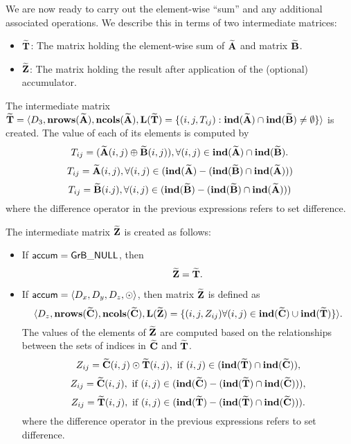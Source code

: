 We are now ready to carry out the element-wise ``sum'' and any additional 
associated operations.  We describe this in terms of two intermediate matrices:
\begin{itemize}
	\item ${\bf \widetilde{T}}$: The matrix holding the element-wise sum of
    ${\bf \widetilde{A}}$ and matrix ${\bf \widetilde{B}}$.
	\item ${\bf \widetilde{Z}}$: The matrix holding the result after 
    application of the (optional) accumulator.
\end{itemize}

The intermediate matrix ${\bf \widetilde{T}} = \langle
D_3, \bold{nrows}({\bf \widetilde{A}}), \bold{ncols}({\bf \widetilde{A}}),
\bold{L}({\bf \widetilde{T}}) =
\{(i,j,T_{ij}) : \bold{ind}({\bf \widetilde{A}}) \cap 
\bold{ind}({\bf \widetilde{B}})
 \neq \emptyset \} \rangle$
is created.  The value of each of its elements is computed by 
\[T_{ij} = ({\bf \widetilde{A}}(i,j) \oplus {\bf \widetilde{B}}(i,j)), \forall (i,j) \in \bold{ind}({\bf \widetilde{A}}) \cap \bold{ind}({\bf \widetilde{B}}).\]
\[T_{ij} = {\bf \widetilde{A}}(i,j), \forall (i,j) \in (\bold{ind}({\bf \widetilde{A}}) - (\bold{ind}({\bf \widetilde{B}}) \cap \bold{ind}({\bf \widetilde{A}})))\]
\[T_{ij} = {\bf \widetilde{B}}(i.j), \forall (i,j) \in (\bold{ind}({\bf \widetilde{B}}) - (\bold{ind}({\bf \widetilde{B}}) \cap \bold{ind}({\bf \widetilde{A}})))\]
where the difference operator in the previous expressions refers to set difference.


The intermediate matrix ${\bf \widetilde{Z}}$ is created as follows:
\begin{itemize}
    \item If ${\sf accum} = {\sf GrB\_NULL}$, then \[ {\bf \widetilde{Z}} = {\bf \widetilde{T}}.\]

    \item If ${\sf accum} = \langle D_x, D_y, D_z, \odot \rangle$, then matrix ${\bf \widetilde{Z}}$ is defined as 
        \[ \langle D_z, \bold{nrows}({\bf \widetilde{C}}), \bold{ncols}({\bf \widetilde{C}}), \bold{L}({\bf \widetilde{Z}})
		= \{(i,j,Z_{ij})  \forall (i,j) \in \bold{ind}({\bf \widetilde{C}}) \cup 
        \bold{ind}({\bf \widetilde{T}}) \} \rangle.\]
    The values of the elements of ${\bf \widetilde{Z}}$ are computed based on the relationships between the sets of indices in ${\bf \widetilde{C}}$ and ${\bf \widetilde{T}}$.
\[
Z_{ij} = {\bf \widetilde{C}}(i,j) \odot {\bf \widetilde{T}}(i,j), \ \mbox{if}\  (i,j) \in  (\bold{ind}({\bf \widetilde{T}}) \cap \bold{ind}({\bf \widetilde{C}})),
\]
\[
Z_{ij} = \matrix{\widetilde{C}}(i,j), \ \mbox{if}\  (i,j) \in  (\bold{ind}(\matrix{\widetilde{C}}) - (\bold{ind}(\matrix{\widetilde{T}}) \cap \bold{ind}(\matrix{\widetilde{C}}))),
\]
\[
Z_{ij} = \matrix{\widetilde{T}}(i,j), \ \mbox{if}\  (i,j) \in  (\bold{ind}(\matrix{\widetilde{T}}) - (\bold{ind}(\matrix{\widetilde{T}}) \cap \bold{ind}(\matrix{\widetilde{C}}))).
\]
where the difference operator in the previous expressions refers to set difference.
\end{itemize}

